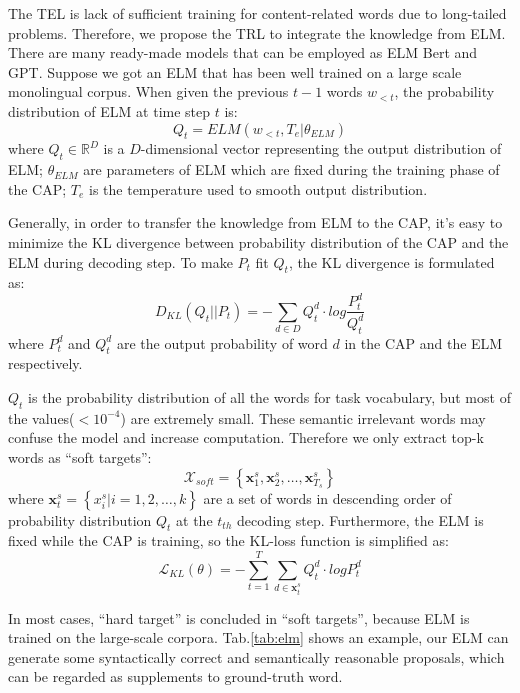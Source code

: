 \documentclass[10pt,twocolumn,letterpaper]{article}
\begin{document}
The TEL is lack of sufficient training for content-related words due to long-tailed problems. Therefore, we propose the TRL to integrate the knowledge from ELM. There are many ready-made models that can be employed as ELM \eg Bert and GPT. Suppose we got an ELM that has been well trained on a large scale monolingual corpus. When given the previous $t-1$ words $w_{<t}$, the probability distribution of ELM at time step $ t $ is:
\begin{equation}\label{key}
Q_t = ELM\left( w_{<t},T_e|\theta_{ELM}\right)
\end{equation}
where $Q_{t}\in \mathbb{R}^{D}$ is a $D$-dimensional vector representing the output distribution of ELM; $\theta_{ELM}$ are parameters of ELM which are fixed during the training phase of the CAP; $T_e$ is the temperature used to smooth output distribution. 

Generally, in order to transfer the knowledge from ELM to the CAP, it's easy to minimize the KL divergence between probability distribution of the CAP and the ELM during decoding step. To make $P_t$ fit $Q_t$, the KL divergence is formulated as:
\begin{equation}\label{key}
D_{KL}(Q_t||P_t) = -\sum_{d\in D}{Q_{t}^d \cdot log\frac{P_{t}^d}{Q_{t}^d}}
\end{equation}
where $P_{t}^d$ and $Q_{t}^d$ are the output probability of word $d$ in the CAP and the ELM respectively.

$Q_t$ is the probability distribution of all the words for task vocabulary, but most of the values($<10^{-4}$) are extremely small. These semantic irrelevant words may confuse the model and increase computation. Therefore we only extract top-k words as ``soft targets'':
\begin{equation}\label{key}
\mathcal{X}_{soft} = \left\lbrace \pmb{x}_1^s,\pmb{x}_2^s,\dots,\pmb{x}^s_{T_{s}} \right\rbrace
\end{equation}
where $\pmb{x}_t^s = \left\lbrace x_i^s|i=1,2,\dots,k\right\rbrace$ are a set of words in descending order of probability distribution $Q_{t}$ at the $t_{th}$ decoding step. Furthermore, the ELM is fixed while the CAP is training, so the KL-loss function is simplified as:
\begin{equation}\label{key}
\mathcal{L}_{KL}(\theta) = - \sum_{t=1}^{T}\sum_{d \in \pmb{x}_t^s} {Q_{t}^d \cdot log{P_{t}^d}}
\end{equation}

In most cases, ``hard target'' is concluded in ``soft targets'', because ELM is trained on the large-scale corpora. Tab.\ref{tab:elm} shows an example, our ELM can generate some syntactically correct and semantically reasonable proposals, which can be regarded as supplements to ground-truth word.
\end{document}
